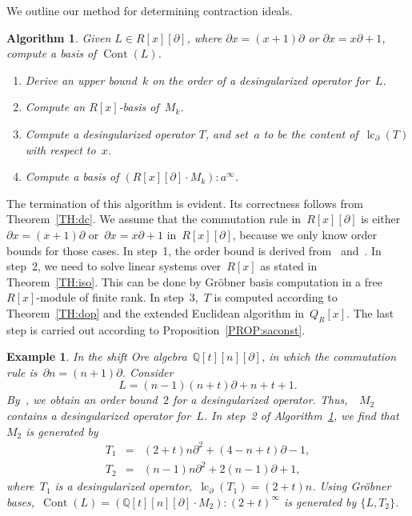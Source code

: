 \documentclass{sig-alternate}
\newcommand{\bQ} { {\mathbb{Q}}}
\newcommand{\cont}{\operatorname{Cont}}
\newcommand{\lc}{\operatorname{lc}}
\newcommand{\pa}{\partial}
\newtheorem{example}[theorem]{Example}
\newtheorem{algo}[theorem]{Algorithm}
\begin{document}
We outline our method for determining contraction ideals.
\begin{algo}\label{ALGO:cont}
Given $L \in R[x][\pa]$, where $\pa x = (x + 1) \pa$ or $\pa x = x \pa + 1$,
compute a basis of $\cont(L)$.
\begin{enumerate}
\item[(1)] Derive an upper bound~$k$ on the order of a desingularized operator for~$L$.
 \item[(2)] Compute an $R[x]$-basis of~$M_k$.
 \item[(3)] Compute a desingularized operator $T$, and set~$a$ to be the content of~$\lc_{\pa}(T)$ with respect to~$x$.
 \item[(4)] Compute a basis of $(R[x][\pa] \cdot M_k) : a^{\infty}$.
\end{enumerate}
\end{algo}
The termination of this algorithm is evident.
Its correctness follows from Theorem~\ref{TH:dc}.
We assume that
the commutation rule in~$R[x][\pa]$ is either~$\pa x = (x + 1) \pa$ or~$\pa x = x \pa + 1$ in~$R[x][\pa]$, because
we only know order bounds for those cases.
In step~1, the order bound is derived from~\cite[Lemma 4]{Chen2013} and~\cite[Algorithm 3.4]{Tsai2000}.
In step~2, we need to solve linear systems over~$R[x]$ as stated in Theorem~\ref{TH:iso}. This can be done
by Gr\"obner basis computation in a free $R[x]$-module of finite rank. In step~3,~$T$ is computed according to Theorem~\ref{TH:dop} and the extended Euclidean algorithm in~$Q_R[x]$. The last step is carried out according to Proposition~\ref{PROP:saconst}.




\begin{example}
In the shift Ore algebra~$\bQ[t][n][\pa]$, in which the commutation rule is~$\pa n = (n + 1) \pa$.
Consider
\[
 L = (n -1) (n + t) \pa + n + t + 1.
\]
By~\cite[Lemma 4]{Chen2013}, we obtain an order bound~$2$ for a desingularized operator. Thus,~~$M_2$ contains a desingularized operator for~$L$.
In step~2 of  Algorithm~\ref{ALGO:cont}, we find that~$M_2$ is generated by
\begin{eqnarray*}
 T_1 & = & (2 + t) n \pa^2 + (4 - n + t) \pa - 1, \\
 T_2 & = & (n - 1) n \pa^2 + 2 ( n - 1) \pa + 1,
\end{eqnarray*}
where~$T_1$ is a desingularized operator,~$\lc_{\pa}(T_1) = (2 + t) n$.
Using Gr\"{o}bner bases,~$\cont(L) = (\bQ[t][n][\pa] \cdot M_2 ) : (2 + t)^{\infty}$ is generated by $\{ L, T_2 \}$.
\end{example}
\end{document}
